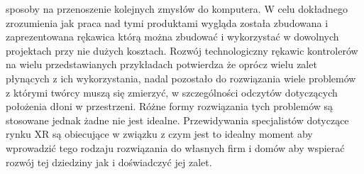 sposoby na przenoszenie kolejnych zmysłów do komputera. W celu dokładnego zrozumienia jak praca nad tymi produktami wygląda została zbudowana i zaprezentowana rękawica którą można zbudować i wykorzystać w dowolnych projektach przy nie dużych kosztach. Rozwój technologiczny rękawic kontrolerów na wielu przedstawianych przykładach potwierdza że oprócz wielu zalet płynących z ich wykorzystania, nadal pozostało do rozwiązania wiele problemów z którymi twórcy muszą się zmierzyć, w szczególności odczytów dotyczących położenia dłoni w przestrzeni. Różne formy rozwiązania tych problemów są stosowane jednak żadne nie jest idealne. Przewidywania specjalistów dotyczące rynku XR są obiecujące w związku z czym jest to idealny moment aby wprowadzić tego rodzaju rozwiązania do własnych firm i domów aby wspierać rozwój tej dziedziny jak i doświadczyć jej zalet. 